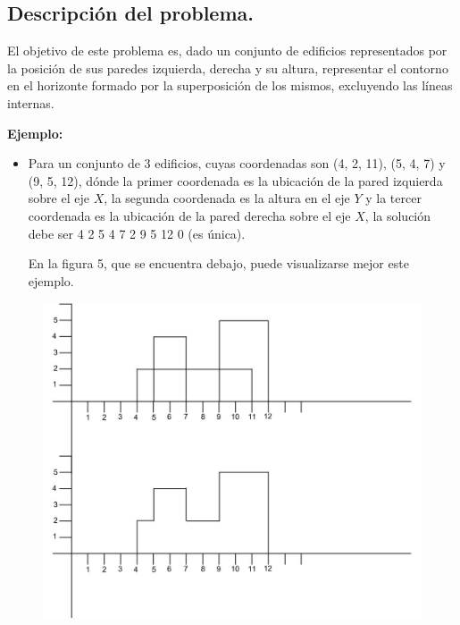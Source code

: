\subsection{Descripción del problema.}

\vspace*{0.3cm}

El objetivo de este problema es, dado un conjunto de edificios representados
por la posición de sus paredes izquierda, derecha y su altura, representar el
contorno en el horizonte formado por la superposición de los mismos, excluyendo
las líneas internas.

\vspace*{0.5cm}

\textbf{Ejemplo:}
\begin{itemize}
  \item Para un conjunto de 3 edificios, cuyas coordenadas son (4, 2, 11),
  (5, 4, 7) y (9, 5, 12), dónde la primer coordenada es la ubicación de la pared
  izquierda sobre el eje $X$, la segunda coordenada es la altura en el eje $Y$ y la
  tercer coordenada es la ubicación de la pared derecha sobre el eje $X$, la
  solución debe ser 4 2 5 4 7 2 9 5 12 0 (es única).
  
  En la figura 5, que se encuentra debajo, puede visualizarse mejor este ejemplo.
\end{itemize}

\begin{figure}[h]
  \begin{center}
    \includegraphics[scale=0.25]{imagenes/ej2.jpg}
  \end{center}
    \caption{}
\end{figure}


